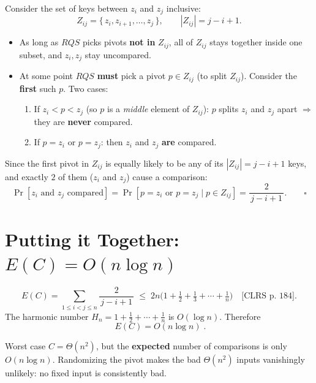 \documentclass[11pt]{article}
\begin{document}
\begin{keybox}
Consider the set of keys between $z_i$ and $z_j$ inclusive:
\[
  Z_{ij} = \{\, z_i, z_{i+1}, \ldots, z_j \,\}, \qquad |Z_{ij}| = j - i + 1.
\]
\begin{itemize}[leftmargin=1.4em,itemsep=2pt]
  \item As long as $RQS$ picks pivots \textbf{not in} $Z_{ij}$, all of $Z_{ij}$ stays together inside one subset, and $z_i, z_j$ stay uncompared.
  \item At some point $RQS$ \textbf{must} pick a pivot $p \in Z_{ij}$ (to split $Z_{ij}$). Consider the \textbf{first} such $p$. Two cases:
  \begin{enumerate}[leftmargin=1.6em,itemsep=1pt]
    \item If $z_i < p < z_j$ (so $p$ is a \emph{middle} element of $Z_{ij}$): $p$ splits $z_i$ and $z_j$ apart $\Rightarrow$ they are \textbf{never} compared.
    \item If $p = z_i$ or $p = z_j$: then $z_i$ and $z_j$ \textbf{are} compared.
  \end{enumerate}
\end{itemize}
Since the first pivot in $Z_{ij}$ is equally likely to be any of its $|Z_{ij}| = j-i+1$ keys, and exactly $2$ of them ($z_i$ and $z_j$) cause a comparison:
\[
  \Pr[z_i \text{ and } z_j \text{ compared}] = \Pr[p = z_i \text{ or } p = z_j \mid p \in Z_{ij}] = \frac{2}{\,j - i + 1\,}. \qquad \square
\]
\end{keybox}

\section{Putting it Together: \textcolor{violetT}{$E(C) = O(n \log n)$}}

\begin{keybox}
\[
  E(C) = \sum_{1 \le i < j \le n} \frac{2}{\,j - i + 1\,}
       \;\le\; 2n\Big(1 + \tfrac12 + \tfrac13 + \cdots + \tfrac1n\Big)
       \quad\text{[CLRS p.\ 184]}.
\]
The harmonic number $H_n = 1 + \tfrac12 + \cdots + \tfrac1n$ is $O(\log n)$. Therefore
\[
  \boxed{\;E(C) = O(n \log n)\;}.
\]
\end{keybox}

\begin{warnbox}
Worst case $C = \Theta(n^2)$, but the \textbf{expected} number of comparisons is only $O(n \log n)$. Randomizing the pivot makes the bad $\Theta(n^2)$ inputs vanishingly unlikely: no fixed input is consistently bad.
\end{warnbox}
\end{document}
